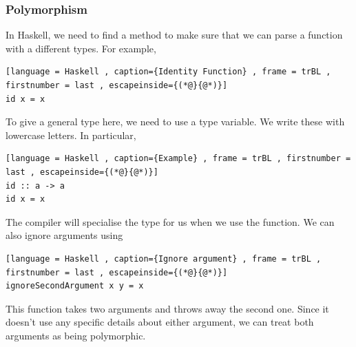 \documentclass[a4paper]{article}
\theoremstyle{plain}
\theoremstyle{definition}
\theoremstyle{remark}
\begin{document}
\subsubsection{Polymorphism}
In Haskell, we need to find a method to make sure that we can parse a function with a different types. For example, 
\begin{lstlisting}[language = Haskell , caption={Identity Function} , frame = trBL , firstnumber = last , escapeinside={(*@}{@*)}]
id x = x
\end{lstlisting}
To give a general type here, we need to use a type variable. We write these with lowercase letters. In particular,
\begin{lstlisting}[language = Haskell , caption={Example} , frame = trBL , firstnumber = last , escapeinside={(*@}{@*)}]
id :: a -> a
id x = x
\end{lstlisting}
The compiler will specialise the type for us when we use the function. We can also ignore arguments using
\begin{lstlisting}[language = Haskell , caption={Ignore argument} , frame = trBL , firstnumber = last , escapeinside={(*@}{@*)}]
ignoreSecondArgument x y = x
\end{lstlisting}
This function takes two arguments and throws away the second one. Since it doesn't use any specific details about either argument, we can treat both arguments as being polymorphic.
\end{document}
